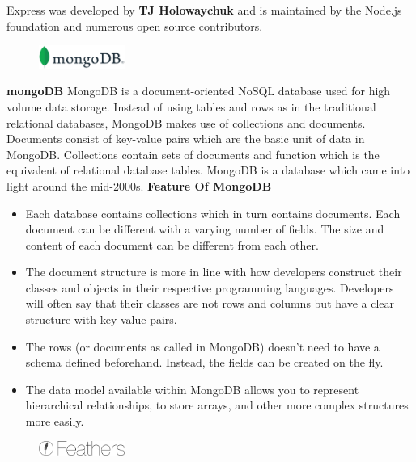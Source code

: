 	Express was developed by \textbf{TJ Holowaychuk} and is maintained by the Node.js foundation and numerous open source contributors.
	\vs[1]
	\begin{figure}
		\centering
		\vspace{-30pt}
		\includegraphics[width=0.25\textwidth]{mongo.png}
		\vspace{-80pt}
	\end{figure}
	\vs
	\textbf{\Large mongoDB}
	\vs
	MongoDB is a document-oriented NoSQL database used for high volume data storage. Instead of using tables and rows as in the traditional relational databases, MongoDB makes use of collections and documents. Documents consist of key-value pairs which are the basic unit of data in MongoDB. Collections contain sets of documents and function which is the equivalent of relational database tables. MongoDB is a database which came into light around the mid-2000s.
	\vs
	\textbf{\large Feature Of MongoDB}
	\begin{itemize}
	\item Each database contains collections which in turn contains documents. Each document can be different with a varying number of fields. The size and content of each document can be different from each other.
	\item The document structure is more in line with how developers construct their classes and objects in their respective programming languages. Developers will often say that their classes are not rows and columns but have a clear structure with key-value pairs.
	\item The rows (or documents as called in MongoDB) doesn't need to have a schema defined beforehand. Instead, the fields can be created on the fly.
	\item The data model available within MongoDB allows you to represent hierarchical relationships, to store arrays, and other more complex structures more easily.
	\end{itemize}
		\vs[1]
	\begin{figure}
		\centering
		\vspace{-25pt}
		\includegraphics[width=0.25\textwidth]{feathers.png}
		\vspace{-80pt}
	\end{figure}
